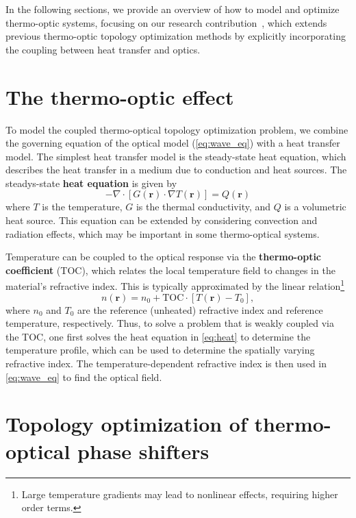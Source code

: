 In the following sections, we provide an overview of how to model and optimize thermo-optic systems, 
focusing on our research contribution~\cite{ownpub0}, which extends previous thermo-optic topology 
optimization methods by explicitly incorporating the coupling between heat transfer and optics.

\section{The thermo-optic effect}\label{sec:to_effect}

To model the coupled thermo-optical topology optimization problem, we combine the governing equation of the optical model (\eqref{eq:wave_eq})
with a heat transfer model. The simplest heat transfer model is the steady-state heat equation, which describes the
heat transfer in a medium due to conduction and heat sources. The steadys-state \textbf{heat equation} is given by
\begin{equation}\label{eq:heat}
 -\nabla \cdot \left[ G(\mathbf{r})\cdot \nabla T(\mathbf{r}) \right] = Q(\mathbf{r})
\end{equation}
where $T$ is the temperature, $G$ is the thermal conductivity, and $Q$ is a volumetric heat source. This equation can be
extended by considering convection and radiation effects, which may be important in some thermo-optical systems.

Temperature can be coupled to the optical response via the \textbf{thermo-optic coefficient} (TOC), which relates the local temperature field
to changes in the material's refractive index. This is typically approximated by the linear relation\footnote{Large temperature gradients may lead to nonlinear effects, requiring higher order terms.}
\begin{equation}
n(\mathbf{r}) = n_0 + \text{TOC} \cdot \left[T(\mathbf{r}) - T_0\right],
\end{equation}
where $n_0$ and $T_0$ are the reference (unheated) refractive index and reference temperature, respectively. Thus, to solve a problem that is weakly coupled via the TOC, one first solves the heat equation
in \eqref{eq:heat}
to determine the temperature profile, which can be used to determine
the spatially varying refractive index. The temperature-dependent refractive index is then used in \eqref{eq:wave_eq} to find the optical field.

\section{Topology optimization of thermo-optical phase shifters~\cite{ownpub0}}\label{sec:TOPS}

